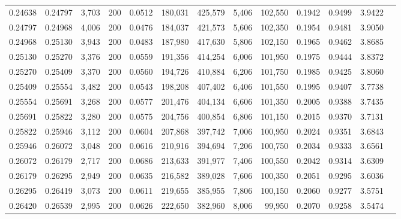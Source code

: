 \begin{tabular}{rrrrrrrrrrrrr}
0.24638 & 0.24797 &  3,703 & 200 &                                     0.0512 & 180,031 & 425,579 &   5,406 & 102,550 & 0.1942 & 0.9499 & 3.9422 \\
0.24797 & 0.24968 &  4,006 & 200 &                                     0.0476 & 184,037 & 421,573 &   5,606 & 102,350 & 0.1954 & 0.9481 & 3.9050 \\
0.24968 & 0.25130 &  3,943 & 200 &                                     0.0483 & 187,980 & 417,630 &   5,806 & 102,150 & 0.1965 & 0.9462 & 3.8685 \\
0.25130 & 0.25270 &  3,376 & 200 &                                     0.0559 & 191,356 & 414,254 &   6,006 & 101,950 & 0.1975 & 0.9444 & 3.8372 \\
0.25270 & 0.25409 &  3,370 & 200 &                                     0.0560 & 194,726 & 410,884 &   6,206 & 101,750 & 0.1985 & 0.9425 & 3.8060 \\
0.25409 & 0.25554 &  3,482 & 200 &                                     0.0543 & 198,208 & 407,402 &   6,406 & 101,550 & 0.1995 & 0.9407 & 3.7738 \\
0.25554 & 0.25691 &  3,268 & 200 &                                     0.0577 & 201,476 & 404,134 &   6,606 & 101,350 & 0.2005 & 0.9388 & 3.7435 \\
0.25691 & 0.25822 &  3,280 & 200 &                                     0.0575 & 204,756 & 400,854 &   6,806 & 101,150 & 0.2015 & 0.9370 & 3.7131 \\
0.25822 & 0.25946 &  3,112 & 200 &                                     0.0604 & 207,868 & 397,742 &   7,006 & 100,950 & 0.2024 & 0.9351 & 3.6843 \\
0.25946 & 0.26072 &  3,048 & 200 &                                     0.0616 & 210,916 & 394,694 &   7,206 & 100,750 & 0.2034 & 0.9333 & 3.6561 \\
0.26072 & 0.26179 &  2,717 & 200 &                                     0.0686 & 213,633 & 391,977 &   7,406 & 100,550 & 0.2042 & 0.9314 & 3.6309 \\
0.26179 & 0.26295 &  2,949 & 200 &                                     0.0635 & 216,582 & 389,028 &   7,606 & 100,350 & 0.2051 & 0.9295 & 3.6036 \\
0.26295 & 0.26419 &  3,073 & 200 &                                     0.0611 & 219,655 & 385,955 &   7,806 & 100,150 & 0.2060 & 0.9277 & 3.5751 \\
0.26420 & 0.26539 &  2,995 & 200 &                                     0.0626 & 222,650 & 382,960 &   8,006 &  99,950 & 0.2070 & 0.9258 & 3.5474 \\

\end{tabular}
